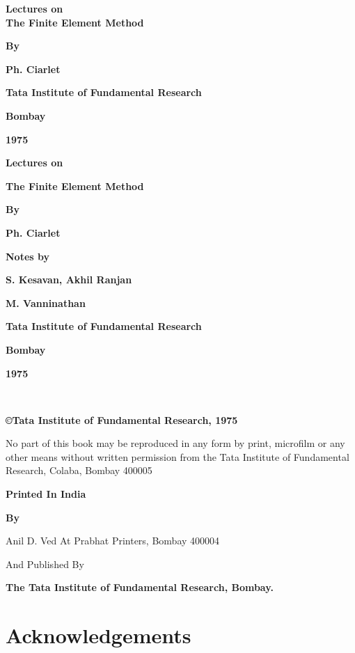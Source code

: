 \thispagestyle{empty}
\begin{center}
{\Large\bf Lectures on}\\[5pt]
{\Large\bf The Finite Element Method}
\vfill

{\bf By}
\medskip

{\large\bf Ph. Ciarlet}
\vfill

{\bf Tata Institute of Fundamental Research}
\medskip

{\bf Bombay}
\medskip

{\bf 1975}
\end{center}
\eject

\thispagestyle{empty}
\begin{center}
{\Large\bf Lectures on}
\medskip

{\Large\bf The Finite Element Method}
\vfill

{\bf By}
\medskip

{\large\bf Ph. Ciarlet}
\vfill


{\bf Notes by}
\medskip

{\large\bf S. Kesavan, Akhil Ranjan}
\medskip

{\large\bf M. Vanninathan}
\vfill

{\bf Tata Institute of Fundamental Research}
\medskip

{\bf Bombay}
\medskip

{\bf 1975}
\end{center}
\eject

\thispagestyle{empty}
\begin{center}
~
\phantom{a}
\vfill

{\bf\copyright \quad Tata Institute of Fundamental Research, 1975}
\bigskip

\parbox{0.7\textwidth}{No part of this book may be reproduced
in any form by print, microfilm or any
other means without written permission
from the Tata Institute of Fundamental
Research, Colaba, Bombay 400005}
\vfill

{\bf Printed In India}
\medskip

{\bf By}
\medskip

{Anil D. Ved At Prabhat Printers, Bombay 400004}
\medskip

{And Published By}
\medskip

{\bf  The Tata Institute of Fundamental Research, Bombay.}
\end{center}
\eject


\chapter{Acknowledgements}


